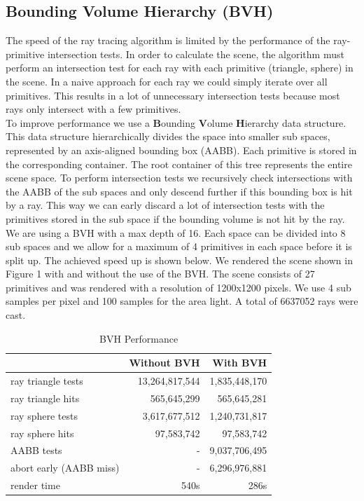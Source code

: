 \documentclass[sigconf, nonacm]{acmart}
\begin{document}
\subsection{Bounding Volume Hierarchy (BVH)}
The speed of the ray tracing algorithm is limited by the performance of the ray-primitive intersection tests. In order to calculate the scene, the algorithm
must perform an intersection test for each ray with each primitive (triangle, sphere) in the scene. 
In a naive approach for each ray we could simply iterate over all primitives. This results in a lot of unnecessary intersection tests because 
most rays only intersect with a few primitives. \\
To improve performance we use a \textbf{B}ounding \textbf{V}olume \textbf{H}ierarchy data structure. This data structure hierarchically divides the space
into smaller sub spaces, represented by an axis-aligned bounding box (AABB). Each primitive is stored in the corresponding container. The root container of this 
tree represents the entire scene space. To perform intersection tests we recursively check intersections with the AABB of the sub spaces and only descend further
if this bounding box is hit by a ray. This way we can early discard a lot of intersection tests with the primitives stored in the sub space if the bounding volume is
not hit by the ray.\\
We are using a BVH with a max depth of 16. Each space can be divided into 8 sub spaces and we allow for a maximum of 4 primitives in each space before it is split up.
The achieved speed up is shown below. We rendered the scene shown in Figure 1 with and without the use of the BVH.
The scene consists of 27 primitives and was rendered with a resolution of 1200x1200 pixels. We use 4 sub samples per pixel and 100 samples for the area light.
A total of 6637052 rays were cast.

\begin{table}[h]
  \caption{BVH Performance}
  \label{tab:bvhperformance}
  \begin{tabular}{lrr}
    \toprule
     & Without BVH & With BVH \\
    \midrule
    ray triangle tests & 13,264,817,544& 1,835,448,170 \\
    ray triangle hits  & 565,645,299 & 565,645,281\\
    ray sphere tests & 3,617,677,512 & 1,240,731,817\\
    ray sphere hits & 97,583,742 & 97,583,742\\
    AABB tests & - & 9,037,706,495\\
    abort early (AABB miss) & - & 6,296,976,881\\
    render time & 540s & 286s\\
    \bottomrule
  \end{tabular}
\end{table}
\end{document}
